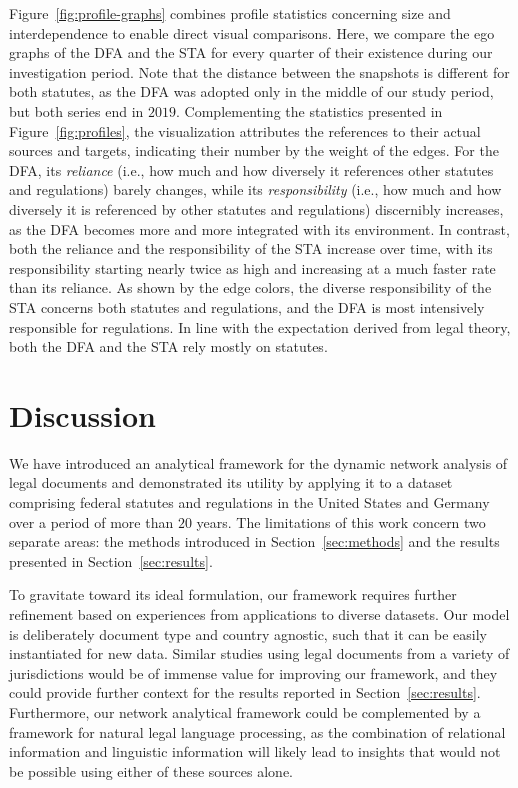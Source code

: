 \documentclass[utf8,sort&compress,table,hidelinks]{frontiersFPHY} %
\begin{document}
Figure~\ref{fig:profile-graphs} combines profile statistics concerning size and interdependence to enable direct visual comparisons. 
Here, we compare the ego graphs of the DFA and the STA for every quarter of their existence during our investigation period.
Note that the distance between the snapshots is different for both statutes, 
as the DFA was adopted only in the middle of our study period, but both series end in $2019$.
Complementing the statistics presented in Figure~\ref{fig:profiles}, the visualization attributes the references to their actual sources and targets, indicating their number by the weight of the edges.
For the DFA, its \emph{reliance} (i.e., how much and how diversely it references other statutes and regulations) barely changes,
while its \emph{responsibility} (i.e., how much and how diversely it is referenced by other statutes and regulations) discernibly increases, 
as the DFA becomes more and more integrated with its environment.
In contrast, both the reliance and the responsibility of the STA increase over time, with its responsibility starting nearly twice as high and increasing at a much faster rate than its reliance.
As shown by the edge colors, the diverse responsibility of the STA concerns both statutes and regulations,
and the DFA is most intensively responsible for regulations.
In line with the expectation derived from legal theory,
both the DFA and the STA rely mostly on statutes.




\section{Discussion}
\label{sec:discussion}

We have introduced an analytical framework for the dynamic network analysis of legal documents and demonstrated its utility by applying it to a dataset comprising federal statutes and regulations in the United States and Germany over a period of more than $20$ years.
The limitations of this work concern two separate areas: 
the methods introduced in Section~\ref{sec:methods} and the results presented in Section~\ref{sec:results}.

To gravitate toward its ideal formulation, our framework requires further refinement based on experiences from applications to diverse datasets.
Our model is deliberately document type and country agnostic, such that it can be easily instantiated for new data. 
Similar studies using legal documents from a variety of jurisdictions would be of immense value for improving our framework, 
and they could provide further context for the results reported in Section~\ref{sec:results}.
Furthermore, our network analytical framework could be complemented by a framework for natural legal language processing, 
as the combination of relational information and linguistic information will likely lead to insights that would not be possible using either of these sources alone.
\end{document}
